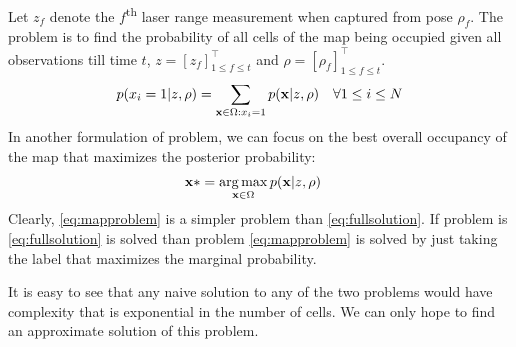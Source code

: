 \documentclass[letterpaper, 10 pt, conference]{ieeeconf} %
\DeclareMathOperator*{\argmax}{arg\,max}
\newcommand{\vect}[1]{\mathbf{#1}}
\begin{document}
Let $z_f$ denote the $f$\textsuperscript{th} laser range measurement when captured from pose $\rho_f$. 
The problem is to find the probability of all cells of the map being occupied given all observations till time $t$, $z = [z_f]^\top_{1 \le f \le t}$ and $\rho = [\rho_f]^\top_{1 \le f \le t}$.
\begin{align}
  p(x_i = 1 | z, \rho) &= \sum_{\map \in \Omega : x_i = 1} p(\map | z , \rho) & \forall 1 \le i \le N 
  \label{eq:fullsolution}
\end{align}
In another formulation of problem, we can focus on the best overall occupancy of the map that maximizes the posterior probability:
\begin{align}
  \vect{x}* &= \argmax_{\map \in \Omega } p(\map | z, \rho)
  \label{eq:mapproblem}
\end{align}
Clearly, \eqref{eq:mapproblem} is a simpler problem than
\eqref{eq:fullsolution}. If problem is \eqref{eq:fullsolution} is solved than
problem \eqref{eq:mapproblem} is solved by just taking the label that maximizes
the marginal probability.

It is easy to see that any naive solution to any of the two problems would have complexity that is exponential in the number of cells. We can only hope to find an approximate solution of this problem.
\end{document}
